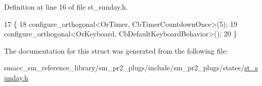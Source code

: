 Definition at line 16 of file st\+\_\+sunday.\+h.


\begin{DoxyCode}
17     \{
18         configure\_orthogonal<OrTimer,  CbTimerCountdownOnce>(5);   
19         configure\_orthogonal<OrKeyboard, CbDefaultKeyboardBehavior>();
20     \}
\end{DoxyCode}


The documentation for this struct was generated from the following file\+:\begin{DoxyCompactItemize}
\item 
smacc\+\_\+sm\+\_\+reference\+\_\+library/sm\+\_\+pr2\+\_\+plugs/include/sm\+\_\+pr2\+\_\+plugs/states/\hyperlink{sm__pr2__plugs_2include_2sm__pr2__plugs_2states_2st__sunday_8h}{st\+\_\+sunday.\+h}\end{DoxyCompactItemize}
